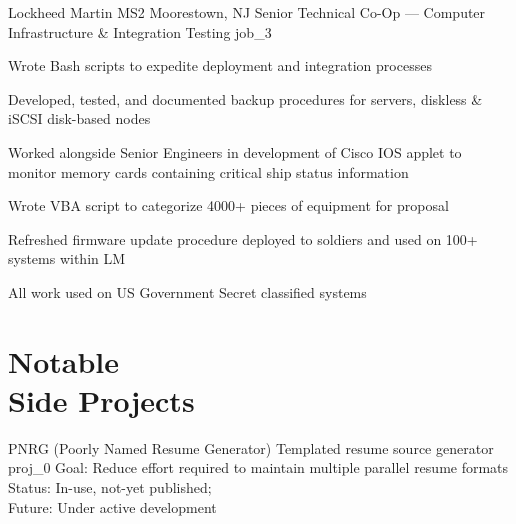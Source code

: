 \documentclass[10pt]{barag_resume}
\begin{document}
    \begin{job}{Lockheed Martin MS2}
        {Moorestown, NJ}
        {Senior Technical Co-Op --- Computer Infrastructure \& Integration Testing}
        {job_3}
            \item Wrote Bash scripts to expedite deployment and integration processes
            \item Developed, tested, and documented backup procedures for servers, diskless \& iSCSI disk-based nodes
            \item Worked alongside Senior Engineers in development of Cisco IOS applet to monitor memory cards containing critical ship status information
            \item Wrote VBA script to categorize 4000+ pieces of equipment for proposal
            \item Refreshed firmware update procedure deployed to soldiers and used on 100+ systems within LM
            \item All work used on US Government Secret classified systems
    \end{job}


\section{Notable\\ Side Projects}\relax
    \begin{project}
        {PNRG (Poorly Named Resume Generator)}
        {Templated resume source generator}
        {proj_0}
            Goal: Reduce effort required to maintain multiple parallel resume formats\\
            Status: In-use, not-yet published;\\
            Future: Under active development
    \end{project}
\end{document}
